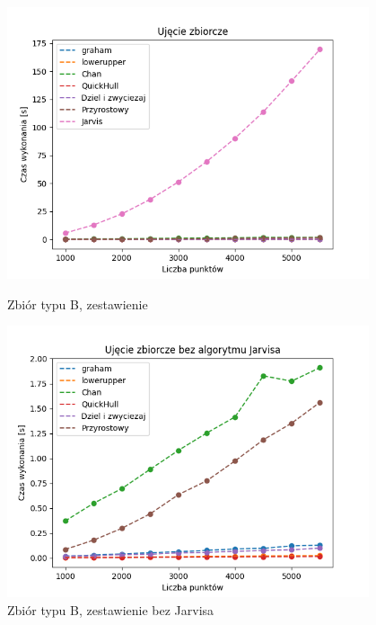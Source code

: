\documentclass[11pt]{article}
\theoremstyle{remark} \newtheorem{definition}{def.}
\theoremstyle{definition} \newtheorem{twierdzenie}{tw.}
\begin{document}
\begin{figure}[]
    \centering
    \begin{minipage}{0.48\textwidth}
        \centering
        \includegraphics[width=0.95\textwidth]{../tests/okrag-zbiorcze.png} %
        \caption{Zbiór typu B, zestawienie}
        \label{fig:okrag-zbiorczy}
    \end{minipage}\hfill
    \begin{minipage}{0.48\textwidth}
        \centering
        \includegraphics[width=0.95\textwidth]{../tests/okrag-zbiorcze-2.png} %
        \caption{Zbiór typu B, zestawienie bez Jarvisa}
        \label{fig:okrag-zbiorczy-2}
    \end{minipage}
\end{figure}
\end{document}
